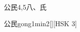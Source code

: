 \begin{entry}{公民}{4,5}{⼋、⽒}
  \begin{phonetics}{公民}{gong1min2}[][HSK 3]
  \end{phonetics}
\end{entry}
